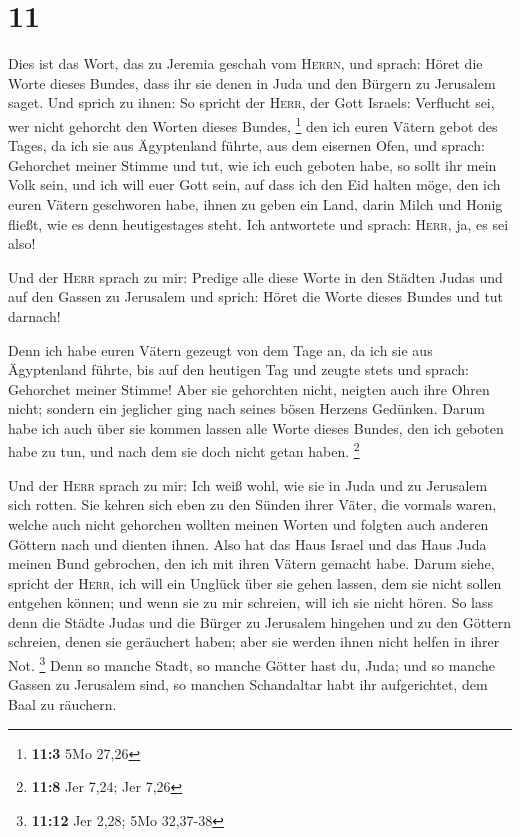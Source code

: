 \hypertarget{section-4}{%
\section{11}\label{section-4}}

 Dies ist das Wort, das zu Jeremia geschah vom
\textsc{Herrn}, und sprach:  Höret die Worte dieses
Bundes, dass ihr sie denen in Juda und den Bürgern zu Jerusalem saget.
 Und sprich zu ihnen: So spricht der \textsc{Herr}, der
Gott Israels: Verflucht sei, wer nicht gehorcht den Worten dieses
Bundes, \footnote{\textbf{11:3} 5Mo 27,26}  den ich euren
Vätern gebot des Tages, da ich sie aus Ägyptenland führte, aus dem
eisernen Ofen, und sprach: Gehorchet meiner Stimme und tut, wie ich euch
geboten habe, so sollt ihr mein Volk sein, und ich will euer Gott sein,
 auf dass ich den Eid halten möge, den ich euren Vätern
geschworen habe, ihnen zu geben ein Land, darin Milch und Honig fließt,
wie es denn heutigestages steht. Ich antwortete und sprach:
\textsc{Herr}, ja, es sei also!

 Und der \textsc{Herr} sprach zu mir: Predige alle diese
Worte in den Städten Judas und auf den Gassen zu Jerusalem und sprich:
Höret die Worte dieses Bundes und tut darnach!

 Denn ich habe euren Vätern gezeugt von dem Tage an, da
ich sie aus Ägyptenland führte, bis auf den heutigen Tag und zeugte
stets und sprach: Gehorchet meiner Stimme!  Aber sie
gehorchten nicht, neigten auch ihre Ohren nicht; sondern ein jeglicher
ging nach seines bösen Herzens Gedünken. Darum habe ich auch über sie
kommen lassen alle Worte dieses Bundes, den ich geboten habe zu tun, und
nach dem sie doch nicht getan haben. \footnote{\textbf{11:8} Jer 7,24;
  Jer 7,26}

 Und der \textsc{Herr} sprach zu mir: Ich weiß wohl, wie
sie in Juda und zu Jerusalem sich rotten.  Sie kehren
sich eben zu den Sünden ihrer Väter, die vormals waren, welche auch
nicht gehorchen wollten meinen Worten und folgten auch anderen Göttern
nach und dienten ihnen. Also hat das Haus Israel und das Haus Juda
meinen Bund gebrochen, den ich mit ihren Vätern gemacht habe.
 Darum siehe, spricht der \textsc{Herr}, ich will ein
Unglück über sie gehen lassen, dem sie nicht sollen entgehen können; und
wenn sie zu mir schreien, will ich sie nicht hören.  So
lass denn die Städte Judas und die Bürger zu Jerusalem hingehen und zu
den Göttern schreien, denen sie geräuchert haben; aber sie werden ihnen
nicht helfen in ihrer Not. \footnote{\textbf{11:12} Jer 2,28; 5Mo
  32,37-38}  Denn so manche Stadt, so manche Götter hast
du, Juda; und so manche Gassen zu Jerusalem sind, so manchen Schandaltar
habt ihr aufgerichtet, dem Baal zu räuchern.

